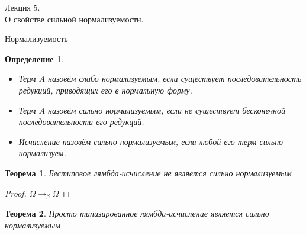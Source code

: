 \documentclass[aspectratio=169]{beamer}
\begin{document}
\newtheorem{dfn}{Определение}[section]
\newtheorem{nte}{Замечание}[section]

\newtheorem{axiom}{Аксиома}[section]
\newtheorem{thm}{Теорема}[section]
\newtheorem{lmm}[theorem]{Лемма}
\newtheorem{statement}{Утверждение}[section]
\newtheorem{oun_paragraph}{Пункт}[section]
\newtheorem{cons}{Следствие}[section]
\newtheorem*{exm}{Пример}

\newcommand{\comb}[1]{\operatorname{\bf{\textrm{#1}}}}
\newcommand{\func}[1]{\operatorname{#1}}
\newcommand{\reduction}[1]{{\color{OrangeRed}#1}}
\newcommand{\set}[1]{\left\{#1\right\}}

\def\from#1{\par \parbox{0.7\textwidth}{\par \hfill\raggedleft \it #1}} 

\begin{frame}{}
\begin{center}\Large Лекция 5.\\ \Large О свойстве сильной нормализуемости.\end{center}
\end{frame}


\begin{frame}{Нормализуемость}
\begin{dfn}
\begin{itemize}
\item Терм $A$ назовём слабо нормализуемым, если существует последовательность редукций,
приводящих его в нормальную форму.
\item Терм $A$ назовём сильно нормализуемым, если не существует бесконечной последовательности
его редукций.
\item Исчисление назовём сильно нормализуемым, если любой его терм сильно нормализуем.
\end{itemize}
\end{dfn}

\vspace{-0.3cm}
\begin{thm}Бестиповое лямбда-исчисление не является сильно нормализуемым\end{thm}
\vspace{-0.3cm}
\begin{proof}$\Omega \rightarrow_\beta \Omega$\end{proof}

\begin{thm}Просто типизированное лямбда-исчисление является сильно нормализуемым\end{thm}
\end{frame}
\end{document}
